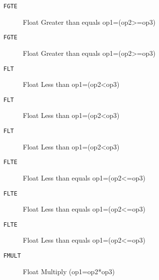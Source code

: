
\begin{description}
\item[\texttt{FGTE       }]  Float Greater than equals op1=(op2>=op3)\\
\end{description}

\begin{description}
\item[\texttt{FGTE       }]  Float Greater than equals op1=(op2>=op3)\\
\end{description}

\begin{description}
\item[\texttt{FLT        }]  Float Less than op1=(op2<op3)\\
\end{description}

\begin{description}
\item[\texttt{FLT        }]  Float Less than op1=(op2<op3)\\
\end{description}

\begin{description}
\item[\texttt{FLT        }]  Float Less than op1=(op2<op3)\\
\end{description}

\begin{description}
\item[\texttt{FLTE       }]  Float Less than equals op1=(op2<=op3)\\
\end{description}

\begin{description}
\item[\texttt{FLTE       }]  Float Less than equals op1=(op2<=op3)\\
\end{description}

\begin{description}
\item[\texttt{FLTE       }]  Float Less than equals op1=(op2<=op3)\\
\end{description}

\begin{description}
\item[\texttt{FMULT      }]  Float Multiply (op1=op2*op3)\\
\end{description}
